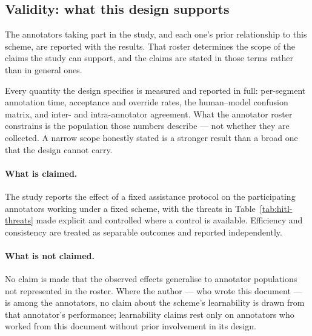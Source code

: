 \subsection{Validity: what this design supports}
\label{sec:hitl-validity}

The annotators taking part in the study, and each one's prior relationship to
this scheme, are reported with the results. That roster determines the scope of
the claims the study can support, and the claims are stated in those terms
rather than in general ones.

\begin{agrulebox}
Every quantity the design specifies is measured and reported in full:
per-segment annotation time, acceptance and override rates, the human--model
confusion matrix, and inter- and intra-annotator agreement. What the annotator
roster constrains is the population those numbers describe --- not whether they
are collected. A narrow scope honestly stated is a stronger result than a broad
one that the design cannot carry.
\end{agrulebox}

\paragraph{What is claimed.} The study reports the effect of a fixed assistance
protocol on the participating annotators working under a fixed scheme, with the
threats in Table~\ref{tab:hitl-threats} made explicit and controlled where a
control is available. Efficiency and consistency are treated as separable
outcomes and reported independently.

\paragraph{What is not claimed.} No claim is made that the observed effects
generalise to annotator populations not represented in the roster. Where the
author --- who wrote this document --- is among the annotators, no claim about
the scheme's learnability is drawn from that annotator's performance;
learnability claims rest only on annotators who worked from this document
without prior involvement in its design.

